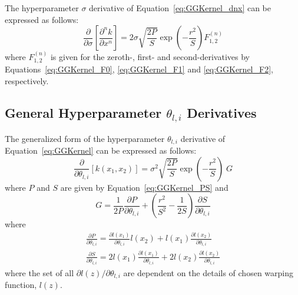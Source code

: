 \documentclass{article}
\begin{document}
The hyperparameter $\sigma$ derivative of Equation~\eqref{eq:GGKernel_dnx} can be expressed as follows:
\begin{equation}
\label{eq:GGKernel_ds_dnx}
	\frac{\partial}{\partial \sigma} \left[\frac{\partial^n k}{\partial x^n}\right] = 2 \sigma \sqrt{\frac{2P}{S}} \exp{\left(-\frac{r^2}{S}\right)} F^{\left(n\right)}_{1,2}
\end{equation}
where $F^{\left(n\right)}_{1,2}$ is given for the zeroth-, first- and second-derivatives by Equations~\eqref{eq:GGKernel_F0}, \eqref{eq:GGKernel_F1} and \eqref{eq:GGKernel_F2}, respectively.

\subsection{General Hyperparameter $\theta_{l,i}$ Derivatives}
\label{subsec:GGHypDer_theta}

The generalized form of the hyperparameter $\theta_{l,i}$ derivative of Equation~\eqref{eq:GGKernel} can be expressed as follows:
\begin{equation}
\label{eq:GGKernel_di}
	\frac{\partial}{\partial \theta_{l,i}} \left[k\!\left(x_1,x_2\right)\right] = \sigma^2 \sqrt{\frac{2P}{S}} \exp{\left(-\frac{r^2}{S}\right)} \; G
\end{equation}
where $P$ and $S$ are given by Equation~\eqref{eq:GGKernel_PS} and
\begin{equation}
\label{eq:GGKernel_di_G}
	G = \frac{1}{2P} \frac{\partial P}{\partial \theta_{l,i}} + \left(\frac{r^2}{S^2} - \frac{1}{2S}\right) \frac{\partial S}{\partial \theta_{l,i}}
\end{equation}
where
\begin{equation}
\label{eq:GGKernel_diPS}
	\begin{gathered}
	\frac{\partial P}{\partial \theta_{l,i}} = \frac{\partial l\!\left(x_1\right)}{\partial \theta_{l,i}} l\!\left(x_2\right) + l\!\left(x_1\right) \frac{\partial l\!\left(x_2\right)}{\partial \theta_{l,i}} \\
	\frac{\partial S}{\partial \theta_{l,i}} = 2 l\!\left(x_1\right) \frac{\partial l\!\left(x_1\right)}{\partial \theta_{l,i}} + 2 l\!\left(x_2\right) \frac{\partial l\!\left(x_2\right)}{\partial \theta_{l,i}}
	\end{gathered}
\end{equation}
where the set of all $\partial l\!\left(z\right)/\partial \theta_{l,i}$ are dependent on the details of chosen warping function, $l\!\left(z\right)$.
\end{document}

